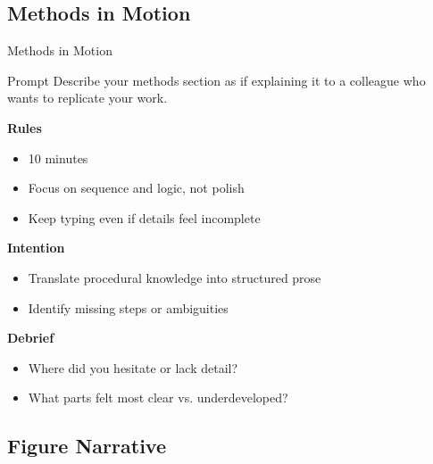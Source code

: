\documentclass{beamer}
\begin{document}
\subsection{Methods in Motion}

\begin{frame}{Methods in Motion}
\begin{block}{Prompt}
Describe your methods section as if explaining it to a colleague who wants to replicate your work.
\end{block}

\vspace{0.8em}
\textbf{Rules}
\begin{itemize}
    \item 10 minutes
    \item Focus on sequence and logic, not polish
    \item Keep typing even if details feel incomplete
\end{itemize}

\textbf{Intention}
\begin{itemize}
    \item Translate procedural knowledge into structured prose
    \item Identify missing steps or ambiguities
\end{itemize}

\textbf{Debrief}
\begin{itemize}
    \item Where did you hesitate or lack detail?
    \item What parts felt most clear vs. underdeveloped?
\end{itemize}
\end{frame}

\subsection{Figure Narrative}
\end{document}
